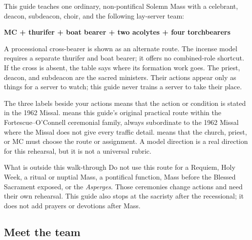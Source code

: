 This guide teaches one ordinary, non-pontifical Solemn Mass with a celebrant,
deacon, subdeacon, choir, and the following lay-server team:

\begin{center}
\textbf{MC + thurifer + boat bearer + two acolytes + four torchbearers}
\end{center}

A processional cross-bearer is shown as an alternate route. The incense model
requires a separate thurifer and boat bearer; it offers no combined-role
shortcut. If the cross is absent, the table says where its formation work
goes. The priest, deacon, and subdeacon are the sacred ministers. Their actions
appear only as things for a server to watch; this guide never trains a server to
take their place.

\begin{coachbox}{The three labels beside your actions}
\MissalRule{} means that the action or condition is stated in the
1962 Missal.  \ModelRule{} means this guide's original practical route
within the Fortescue--O'Connell ceremonial family, always subordinate to the
1962 Missal where the Missal does not give every traffic detail.
\LocalChoice{} means
that the church, priest, or MC must choose the route or assignment.  A model
direction is a real direction for this rehearsal, but it is not a universal
rubric.
\end{coachbox}

\begin{watchbox}{What is outside this walk-through}
Do not use this route for a Requiem, Holy Week, a ritual or nuptial Mass, a
pontifical function, Mass before the Blessed Sacrament exposed, or the
\emph{Asperges}.  Those ceremonies change actions and need their own rehearsal.
This guide also stops at the sacristy after the recessional; it does not add
prayers or devotions after Mass.
\end{watchbox}

\subsection{Meet the team}

